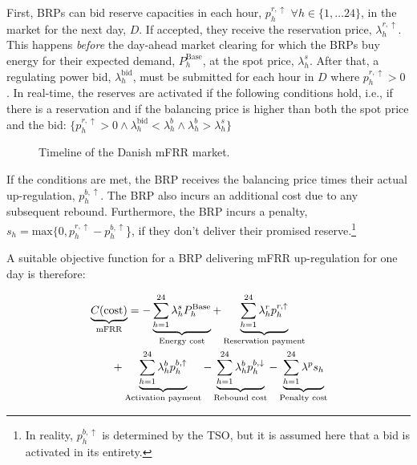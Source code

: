 First, BRPs can bid reserve capacities in each hour, $p_{h}^{r,\uparrow}$ $\forall{h} \in \{1, \ldots 24 \}$, in the market for the next day, $D$. If accepted, they receive the reservation price, $\lambda_{h}^{r,\uparrow}$. This happens \textit{before} the day-ahead market clearing for which the BRPs buy energy for their expected demand, $P_{h}^{\text{Base}}$, at the spot price, $\lambda_{h}^{s}$. After that, a regulating power bid, $\lambda_{h}^{\text{bid}}$, must be submitted for each hour in $D$ where $p_{h}^{r,\uparrow} > 0$ \cite{energinet:Systemydelser}. In real-time, the reserves are activated if the following conditions hold, i.e., if there is a reservation and if the balancing price is higher than both the spot price and the bid: $\{p_{h}^{r,\uparrow} > 0 \land \lambda_{h}^{\text{bid}} <  \lambda_{h}^{b} \land \lambda_{h}^{b} > \lambda_{h}^{s} \}$



\begin{figure}[!t]
    \centering
    
    \caption{Timeline of the Danish mFRR market.}
    \label{fig:timeline_mfrr}
\end{figure}


If the conditions are met, the BRP receives the balancing price times their actual up-regulation, $p_{h}^{b,\uparrow}$. The BRP also incurs an additional cost due to any subsequent rebound. Furthermore, the BRP incurs a penalty, $s_{h} = \text{max}\{0, p_{h}^{r,\uparrow} - p_{h}^{b,\uparrow}$\}, if they don't deliver their promised reserve.\footnote{In reality, $p_{h}^{b,\uparrow}$ is determined by the TSO, but it is assumed here that a bid is activated in its entirety.}

A suitable objective function for a BRP delivering mFRR up-regulation for one day is therefore:

\begin{align}\label{eq:mFRRObjective}
     & \underbrace{C(\text{cost})}_{\text{mFRR}} = - \underbrace{\sum_{h=1}^{24} \lambda^{s}_{h}P^{\text{Base}}_{h}}_{\textrm{Energy cost}} + \underbrace{\sum_{h=1}^{24}\lambda_{h}^{r} p^{r, \uparrow}_{h}}_{\textrm{Reservation payment}}  \notag \\ & \quad \quad + \underbrace{\sum_{h=1}^{24}  \lambda_{h}^{b} p^{b,\uparrow}_{h}}_{\textrm{Activation payment}} - \underbrace{\sum_{h=1}^{24}  \lambda_{h}^{b} p^{b,\downarrow}_{h}}_{\textrm{Rebound cost}} - \underbrace{ \sum_{h=1}^{24}  \lambda^{p}s_{h}}_{\textrm{Penalty cost}}
\end{align}


